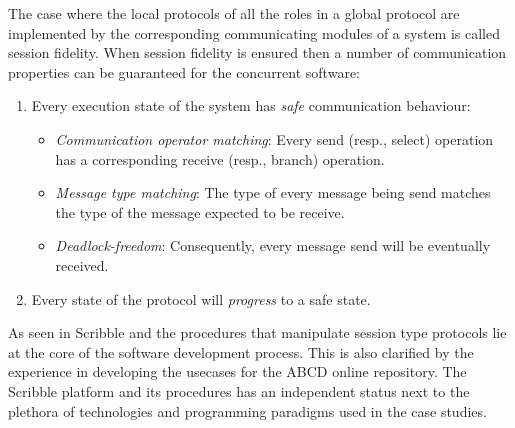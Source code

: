 The case where the local protocols of all the roles in a global protocol
are implemented by the corresponding communicating modules of
a system is called session fidelity. When session fidelity is
ensured
then a number of communication properties can be guaranteed
for the concurrent software:
%
\begin{enumerate}[label=$\bullet$]
	\item	Every execution state of the system has {\em safe} communication behaviour:
	\begin{itemize}
		\item	{\em Communication operator matching}: Every send (resp., select) operation has a corresponding receive (resp., branch) operation.
		\item	{\em Message type matching}: The type of every message being send matches the type of the message expected to be receive.
		\item	{\em Deadlock-freedom}: Consequently, every message send will be eventually received.
	\end{itemize}
	
	\item	Every state of the protocol will {\em progress} to a safe state.
\end{enumerate}

As seen in  Scribble and the procedures
that manipulate session type protocols lie at the core
of the software development process. This is also clarified
by the experience in developing the usecases for the ABCD
online repository. The Scribble platform and its procedures
has an independent status next to the plethora of technologies and
programming paradigms used in the case studies.

%


%

